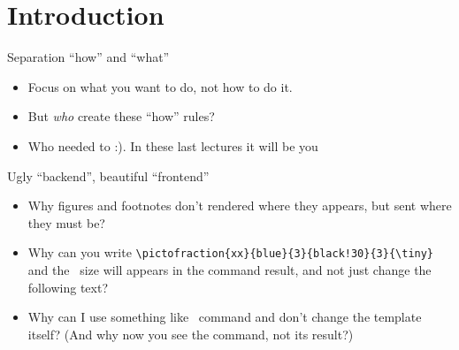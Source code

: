 \graphicspath{{sec0/images/}{sec0/code/}}
\lstset{inputpath=sec0/code/}

\section{Introduction}

\begin{frame}{Separation ``how'' and ``what''}\relax

    \begin{itemize}
        \item Focus on what you want to do, not how to do it. \inpause
        \item But \textit{who} create these ``how'' rules?\inpause
        \item Who needed to :). In these last lectures it will be you
         
    \end{itemize}
     
\end{frame}

\begin{frame}[fragile]{Ugly ``backend'', beautiful ``frontend''}\relax

    \begin{itemize}
        \item Why figures and footnotes don't rendered where they appears, but sent where they must be?
        \item Why can you write \verb|\pictofraction{xx}{blue}{3}{black!30}{3}{\tiny}| and the \string\tiny\ size will appears in the command result, and not {\tiny just change the following text?}
        \item Why can I use something like \ccol\magicPage\ command and don't change the template itself? (And why now you see the command, not its result?) 
    \end{itemize}
\end{frame}

